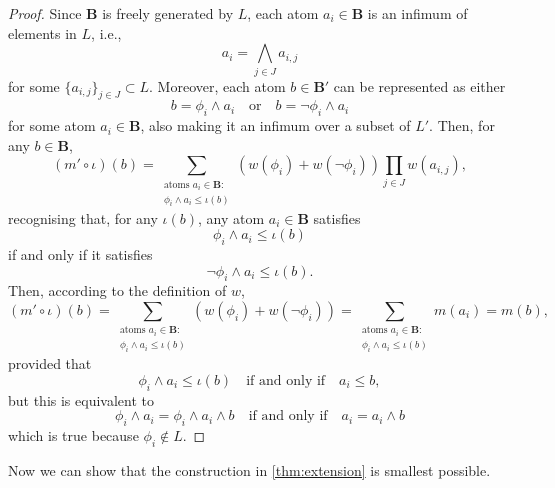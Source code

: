 \documentclass{article}
\theoremstyle{definition}
\theoremstyle{remark}
\begin{document}
\begin{proof} %
  Since $\mathbf{B}$ is freely generated by $L$, each atom $a_i \in \mathbf{B}$
  is an infimum of elements in $L$, i.e.,
  \[
    a_i = \bigwedge_{j \in J} a_{i,j}
  \]
  for some $\{ a_{i,j} \}_{j \in J} \subset L$. Moreover, each atom $b \in
  \mathbf{B'}$ can be represented as either
  \[
    b = \phi_i \land a_i \quad \text{or} \quad b = \neg\phi_i \land a_i
  \]
  for some atom $a_i \in \mathbf{B}$, also making it an infimum over a subset of
  $L'$. Then, for any $b \in \mathbf{B}$,
  \[
    (m' \circ \iota)(b) = \sum_{\substack{\text{atoms } a_i \in \mathbf{B}:\\
        \phi_i \land a_i \le \iota(b)}} (w(\phi_i) + w(\neg\phi_i)) \prod_{j \in
    J} w(a_{i,j}),
  \]
  recognising that, for any $\iota(b)$, any atom $a_i \in \mathbf{B}$ satisfies
  \[
    \phi_i \land a_i \le \iota(b)
  \]
  if and only if it satisfies
  \[
    \neg\phi_i \land a_i \le \iota(b).
  \]
  Then, according to the definition of $w$,
  \[
    (m' \circ \iota)(b) = \sum_{\substack{\text{atoms } a_i \in \mathbf{B}:\\
        \phi_i \land a_i \le \iota(b)}} (w(\phi_i) + w(\neg\phi_i)) =
    \sum_{\substack{\text{atoms } a_i \in \mathbf{B}:\\ \phi_i \land a_i \le
        \iota(b)}} m(a_i) = m(b),
  \]
  provided that
  \[
    \phi_i \land a_i \le \iota(b) \quad \text{if and only if} \quad a_i \le b,
  \]
  but this is equivalent to
  \[
    \phi_i \land a_i = \phi_i \land a_i \land b \quad \text{if and only if}
    \quad a_i = a_i \land b
  \]
  which is true because $\phi_i \not\in L$.
\end{proof}

Now we can show that the construction in \cref{thm:extension} is smallest
possible.
\end{document}

